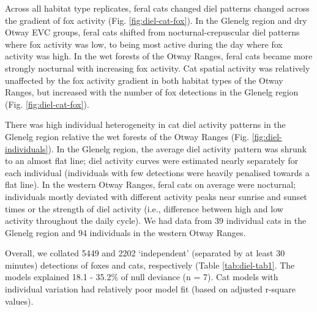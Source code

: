 \documentclass[11pt,a4paper,titlepage,twoside,openright]{style/unimelbthesis}
\begin{document}
\begin{mainmatter}
Across all habitat type replicates, feral cats changed diel patterns changed across the gradient of fox activity (Fig. \ref{fig:diel-cat-fox}). In the Glenelg region and dry Otway EVC groups, feral cats shifted from nocturnal-crepuscular diel patterns where fox activity was low, to being most active during the day where fox activity was high. In the wet forests of the Otway Ranges, feral cats became more strongly nocturnal with increasing fox activity. Cat spatial activity was relatively unaffected by the fox activity gradient in both habitat types of the Otway Ranges, but increased with the number of fox detections in the Glenelg region (Fig. \ref{fig:diel-cat-fox}).

There was high individual heterogeneity in cat diel activity patterns in the Glenelg region relative the wet forests of the Otway Ranges (Fig. \ref{fig:diel-individuals}). In the Glenelg region, the average diel activity pattern was shrunk to an almost flat line; diel activity curves were estimated nearly separately for each individual (individuals with few detections were heavily penalised towards a flat line). In the western Otway Ranges, feral cats on average were nocturnal; individuals mostly deviated with different activity peaks near sunrise and sunset times or the strength of diel activity (i.e., difference between high and low activity throughout the daily cycle). We had data from 39 individual cats in the Glenelg region and 94 individuals in the western Otway Ranges.

Overall, we collated 5449 and 2202 `independent' (separated by at least 30 minutes) detections of foxes and cats, respectively (Table \ref{tab:diel-tab1}. The models explained 18.1 - 35.2\% of null deviance (n = 7). Cat models with individual variation had relatively poor model fit (based on adjusted r-square values).

\newpage


\end{mainmatter}
\end{document}
